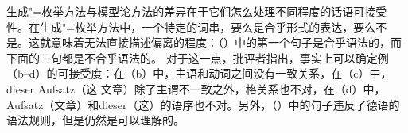 生成"=枚举方法与模型论方法的差异在于它们怎么处理不同程度的话语可接受性。在生成"=枚举方法中，一个特定的词串，要么是合乎形式的表达，要么不是。这就意味着无法直接描述偏离的程度：（）中的第一个句子是合乎语法的，而下面的三句都是不合乎语法的。
\eal
{}
\zl
对于这一点，批评者指出，事实上可以确定例（b--d）的可接受度：在（b）中，主语和动词之间没有一致关系，在（c）中，dieser Aufsatz（这 文章）除了主谓不一致之外，格关系也不对，在（d）中，Aufsatz（文章）和dieser（这）的语序也不对。另外，（）中的句子违反了德语的语法规则，但是仍然是可以理解的。
